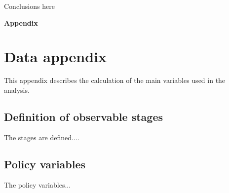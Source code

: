 \documentclass[12pt,english]{article}
\begin{document}
Conclusions here

\pagebreak{}

\setlength\bibsep{0.65pt}
\setlength{\parskip}{0.1em}





\pagebreak{}



\appendix
\vphantom{}
\begin{center}
\textbf{\LARGE{}Appendix}
\par\end{center}{\LARGE \par}

\setcounter{figure}{0} \renewcommand{\thefigure}{A.\arabic{figure}}
\setcounter{table}{0} \renewcommand{\thetable}{A.\arabic{table}}


\section{Data appendix\label{sec:Figures}}
\begin{spacing}{0.40000000000000002}

This appendix describes the calculation of the main variables used in the analysis.

\subsection{Definition of observable stages}

The stages are defined....

\subsection{Policy variables}

The policy variables...



\end{spacing}
\end{document}
